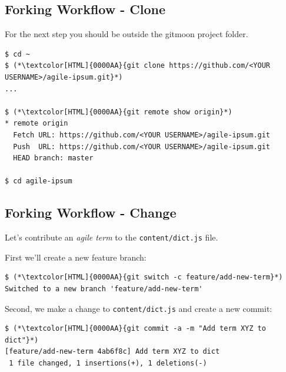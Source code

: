 \subsection{Forking Workflow - Clone}
\begin{frame}[fragile]
  \subslidetitle

  For the next step you should be outside the gitmoon project folder.

  \begin{lstlisting}
$ cd ~
$ (*\textcolor[HTML]{0000AA}{git clone https://github.com/<YOUR USERNAME>/agile-ipsum.git}*)
...

$ (*\textcolor[HTML]{0000AA}{git remote show origin}*)
* remote origin
  Fetch URL: https://github.com/<YOUR USERNAME>/agile-ipsum.git
  Push  URL: https://github.com/<YOUR USERNAME>/agile-ipsum.git
  HEAD branch: master

$ cd agile-ipsum
\end{lstlisting}

\end{frame}

\subsection{Forking Workflow - Change}
\begin{frame}[fragile]
  \subslidetitle

  Let's contribute an \textit{agile term} to the \lstinline{content/dict.js} file.
  \vspace{1em}

  First we'll create a new feature branch:

  \begin{lstlisting}
$ (*\textcolor[HTML]{0000AA}{git switch -c feature/add-new-term}*)
Switched to a new branch 'feature/add-new-term'
\end{lstlisting}

  Second, we make a change to \lstinline{content/dict.js} and create a new commit:

  \begin{lstlisting}
$ (*\textcolor[HTML]{0000AA}{git commit -a -m "Add term XYZ to dict"}*)
[feature/add-new-term 4ab6f8c] Add term XYZ to dict
 1 file changed, 1 insertions(+), 1 deletions(-)
\end{lstlisting}

\end{frame}

